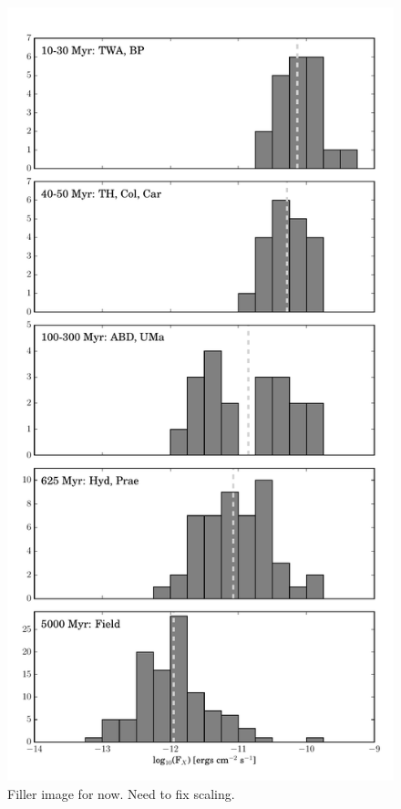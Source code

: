 \documentclass[twocolumn]{aastex62}
\begin{document}
\begin{figure}[h]
\centering
\includegraphics[height=\textheight]{histfd_xray.pdf}
\caption{Filler image for now. Need to fix scaling. \label{fig:histfd_xray}}
\end{figure}
\end{document}
